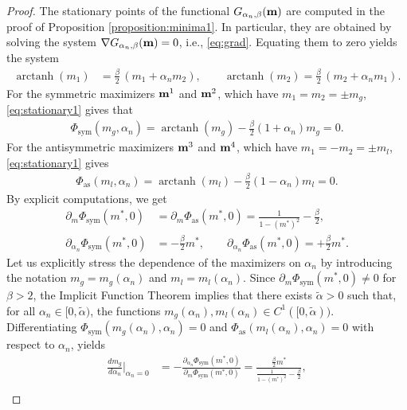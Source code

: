 \documentclass[11pt,oneside]{amsart}
\numberwithin{equation}{section}  %
\theoremstyle{plain}
\theoremstyle{remark}
\def \bm {{\bf m}}
\begin{document}
\begin{proof}
The stationary points of the functional $G_{\alpha_n,\beta}(\bm)$ are computed in the proof of Proposition \ref{proposition:minima1}. 
In particular, they are obtained by solving the system $\nabla G_{\alpha_n,\beta}(\bm)=0$, i.e., \eqref{eq:grad}.
Equating them to zero yields the system
\begin{align}\label{eq:stationary1}
\operatorname{arctanh}(m_1) &= \frac{\beta}{2}\,(m_1 + \alpha_n m_2),\qquad
\operatorname{arctanh}(m_2) = \frac{\beta}{2}\,(m_2 + \alpha_n m_1).
\end{align}  
For the symmetric maximizers $\bm^{1}$ and $\bm^{2}$, which have $m_1=m_2=\pm m_g$, \eqref{eq:stationary1} gives that 
\begin{align*}
\Phi_{\mathrm{sym}}(m_g,\alpha_n) =\operatorname{arctanh}(m_g) - \frac{\beta}{2}(1+\alpha_n)m
_g= 0.
\end{align*}
For the antisymmetric maximizers $\bm^{3}$ and $\bm^{4}$, which have $m_1=-m_2=\pm m_l$, \eqref{eq:stationary1} gives
\begin{align*}
\Phi_{\mathrm{as}}(m_l,\alpha_n) =\operatorname{arctanh}(m_l) - \frac{\beta}{2}(1-\alpha_n)m_l =0.
\end{align*}
By explicit computations, we get
\begin{align*}
\partial_m \Phi_{\mathrm{sym}}(m^*,0)
&=
\partial_m \Phi_{\mathrm{as}}(m^*,0)
=
\frac{1}{1-(m^*)^2} - \frac{\beta}{2},
\\[2mm]
\partial_{\alpha_n} \Phi_{\mathrm{sym}}(m^*,0)
&= -\frac{\beta}{2}m^*,
\qquad
\partial_{\alpha_n}\Phi_{\mathrm{as}}(m^*,0)
= +\frac{\beta}{2}m^*.
\end{align*}
Let us explicitly stress the dependence of the maximizers on $\alpha_n$ by introducing the notation $m_g = m_g(\alpha_n)$ and $m_l = m_l(\alpha_n)$. Since $\partial_m\Phi_{\mathrm{sym}}(m^*,0)\neq 0$ for $\beta>2$, the Implicit Function Theorem implies that there exists $\tilde\alpha>0$ such that, for all $\alpha_n \in  [0,\tilde\alpha)$, the functions $m_g(\alpha_n), m_l(\alpha_n) \in C^1([0,\tilde\alpha))$. Differentiating \(\Phi_{\mathrm{sym}}(m_g(\alpha_n),\alpha_n)=0\) and \(\Phi_{\mathrm{as}}(m_l(\alpha_n),\alpha_n)=0\) with respect to $\alpha_n$, yields
\begin{align*}
\frac{d m_g}{d\alpha_n}\Big|_{\alpha_n=0}
&=
-\frac{\partial_{\alpha_n} \Phi_{\mathrm{sym}}(m^*,0)}
{\partial_m \Phi_{\mathrm{sym}}(m^*,0)}
=
\frac{\frac{\beta}{2}m^*}
{\frac{1}{1-(m^*)^2}-\frac{\beta}{2}},
\\[4mm]

\end{align*}
\end{proof}
\end{document}
